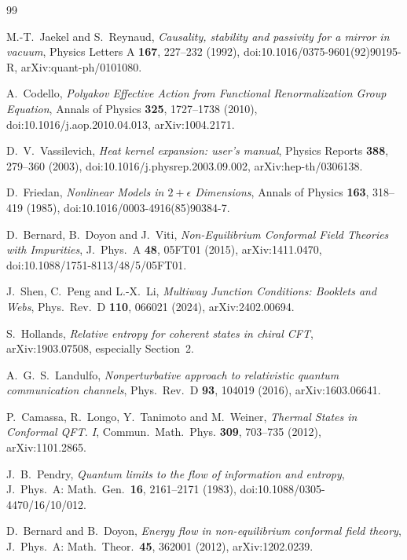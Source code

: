 \documentclass[12pt,a4paper]{article}
\begin{document}
\begin{thebibliography}{99}

M.-T.~Jaekel and S.~Reynaud, \emph{Causality, stability and passivity
for a mirror in vacuum}, Physics Letters A \textbf{167}, 227--232
(1992), doi:10.1016/0375-9601(92)90195-R,
arXiv:quant-ph/0101080.

A.~Codello, \emph{Polyakov Effective Action from Functional
Renormalization Group Equation}, Annals of Physics \textbf{325},
1727--1738 (2010), doi:10.1016/j.aop.2010.04.013,
arXiv:1004.2171.

D.~V.~Vassilevich, \emph{Heat kernel expansion: user's manual},
Physics Reports \textbf{388}, 279--360 (2003),
doi:10.1016/j.physrep.2003.09.002, arXiv:hep-th/0306138.

D.~Friedan, \emph{Nonlinear Models in $2+\epsilon$ Dimensions},
Annals of Physics \textbf{163}, 318--419 (1985),
doi:10.1016/0003-4916(85)90384-7.

D.~Bernard, B.~Doyon and J.~Viti,
\emph{Non-Equilibrium Conformal Field Theories with Impurities},
J.~Phys.~A \textbf{48}, 05FT01 (2015), arXiv:1411.0470,
doi:10.1088/1751-8113/48/5/05FT01.

J.~Shen, C.~Peng and L.-X.~Li, \emph{Multiway Junction Conditions:
Booklets and Webs}, Phys.\ Rev.\ D \textbf{110}, 066021 (2024),
arXiv:2402.00694.

S.~Hollands, \emph{Relative entropy for coherent states in chiral CFT},
arXiv:1903.07508, especially Section~2.

A.~G.~S.~Landulfo, \emph{Nonperturbative approach to relativistic quantum communication channels},
Phys.\ Rev.\ D \textbf{93}, 104019 (2016), arXiv:1603.06641.

P.~Camassa, R.~Longo, Y.~Tanimoto and M.~Weiner,
\emph{Thermal States in Conformal QFT. I}, Commun.\ Math.\ Phys.
\textbf{309}, 703--735 (2012), arXiv:1101.2865.

J.~B.~Pendry, \emph{Quantum limits to the flow of information and entropy},
J.\ Phys.\ A: Math.\ Gen.\ \textbf{16}, 2161--2171 (1983),
doi:10.1088/0305-4470/16/10/012.

D.~Bernard and B.~Doyon, \emph{Energy flow in non-equilibrium conformal field theory},
J.\ Phys.\ A: Math.\ Theor.\ \textbf{45}, 362001 (2012), arXiv:1202.0239.


\end{thebibliography}
\end{document}
